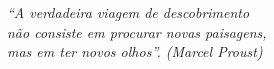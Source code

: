 \begin{epigrafe}[]
    \vspace*{\fill}
	\begin{flushright}
	
		\textit{
				“A verdadeira viagem de descobrimento \\ não consiste em procurar novas paisagens,\\ mas em ter novos olhos”. (Marcel Proust)
				}
		
	\end{flushright}
\end{epigrafe}
